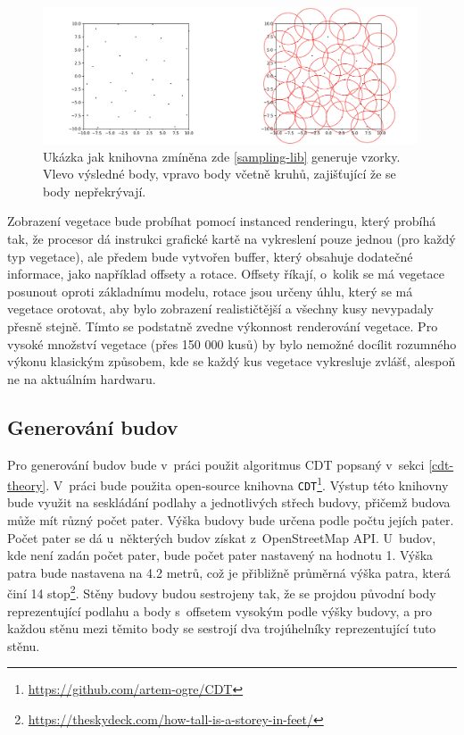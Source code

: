 \begin{figure}[H]
	\centering
	\includegraphics[width=30em]{images/generation/poisson-sampling-example.png}
	\caption[caption]{Ukázka jak knihovna zmíněna zde \ref{sampling-lib} generuje vzorky. Vlevo výsledné body, vpravo body včetně kruhů, zajišťující že se body nepřekrývají.\footnotemark} 
	\label{sampling-lib-example}
\end{figure}


Zobrazení vegetace bude probíhat pomocí instanced renderingu, který probíhá tak, že procesor dá instrukci grafické kartě na vykreslení pouze jednou (pro každý typ vegetace), ale předem bude vytvořen buffer, který obsahuje dodatečné informace, jako například offsety a rotace. Offsety říkají, o~kolik se má vegetace posunout oproti základnímu modelu, rotace jsou určeny úhlu, který se má vegetace orotovat, aby bylo zobrazení realističtější a všechny kusy nevypadaly přesně stejně. Tímto se podstatně zvedne výkonnost renderování vegetace. Pro vysoké množství vegetace (přes 150 000 kusů) by bylo nemožné docílit rozumného výkonu klasickým způsobem, kde se každý kus vegetace vykresluje zvlášť, alespoň ne na aktuálním hardwaru.

\subsection*{Generování budov}
Pro generování budov bude v~práci použit algoritmus CDT popsaný v~sekci \ref{cdt-theory}. V~práci bude použita open-source knihovna \verb|CDT|\footnote{\href{https://github.com/artem-ogre/CDT}{https://github.com/artem-ogre/CDT}}. Výstup této knihovny bude využit na seskládání podlahy a jednotlivých střech budovy, přičemž budova může mít různý počet pater. Výška budovy bude určena podle počtu jejích pater. Počet pater se dá u~některých budov získat z~OpenStreetMap API. U~budov, kde není zadán počet pater, bude počet pater nastavený na hodnotu 1. Výška patra bude nastavena na 4.2 metrů, což je přibližně průměrná výška patra, která činí 14 stop\footnote{\href{https://theskydeck.com/how-tall-is-a-storey-in-feet/}{https://theskydeck.com/how-tall-is-a-storey-in-feet/}}. Stěny budovy budou sestrojeny tak, že se projdou původní body reprezentující podlahu a body s~offsetem vysokým podle výšky budovy, a pro každou stěnu mezi těmito body se sestrojí dva trojúhelníky reprezentující tuto stěnu.

